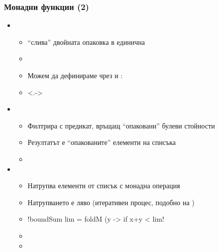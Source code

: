 \documentclass[alsotrans]{beamerswitch}
\begin{document}
\begin{frame}[fragile]
  \frametitle{Монадни функции (2)}
  \begin{fixedarea}
    \begin{itemize}[<+->]
    \item {}
      \begin{itemize}
      \item ``слива'' двойната опаковка в единична
      \item {}
      \item Можем да дефинираме \lst{(>>=)} чрез  и :
      \item<.->  
      \end{itemize}
    \item {}
      \begin{itemize}
      \item Филтрира с предикат, връщащ ``опаковани'' булеви стойности
      \item Резултатът е ``опакованите'' елементи на списъка
      \item {}
      \end{itemize}
    \item {}
      \begin{itemize}
      \item Натрупва елементи от списък с монадна операция
      \item Натрупването е ляво (итеративен процес, подобно на )
      \item
        \lst!boundSum lim = foldM (\x y -> if x+y < lim!\\
        \hspace{30ex}
      \item {}
      \item {}
      \end{itemize}
    \end{itemize}
  \end{fixedarea}
\end{frame}
\end{document}
